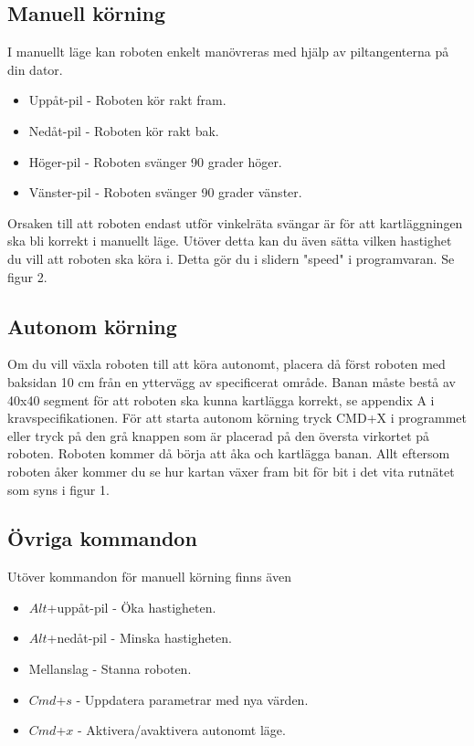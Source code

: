 \documentclass[a4paper,12pt,fleqn]{article}
\begin{document}
\subsection{Manuell körning}
I manuellt läge kan roboten enkelt manövreras med hjälp av piltangenterna på din dator.
\begin{itemize}
	\item Uppåt-pil - Roboten kör rakt fram.
	\item Nedåt-pil - Roboten kör rakt bak.
	\item Höger-pil - Roboten svänger 90 grader höger.
	\item Vänster-pil - Roboten svänger 90 grader vänster.
\end{itemize}
Orsaken till att roboten endast utför vinkelräta svängar är för att kartläggningen ska bli korrekt i manuellt läge. Utöver detta kan du även sätta vilken hastighet du vill att roboten ska köra i. Detta gör du i slidern "speed" i programvaran. Se figur 2. 
	
\subsection{Autonom körning}
Om du vill växla roboten till att köra autonomt, placera då först roboten med baksidan 10 cm från en yttervägg av specificerat område. Banan måste bestå av 40x40 segment för att roboten ska kunna kartlägga korrekt, se appendix A i kravspecifikationen. För att starta autonom körning tryck CMD+X i programmet eller tryck på den grå knappen som är placerad på den översta virkortet på roboten. Roboten kommer då börja att åka och kartlägga banan. Allt eftersom roboten åker kommer du se hur kartan växer fram bit för bit i det vita rutnätet som syns i figur 1. 

\subsection{Övriga kommandon}
Utöver kommandon för manuell körning finns även
\begin{itemize}
	\item $Alt$+uppåt-pil - Öka hastigheten.
	\item $Alt$+nedåt-pil - Minska hastigheten.
	\item Mellanslag - Stanna roboten.
	\item $Cmd$+$s$ - Uppdatera parametrar med nya värden.
	\item $Cmd$+$x$ - Aktivera/avaktivera autonomt läge.
\end{itemize}
\end{document}
